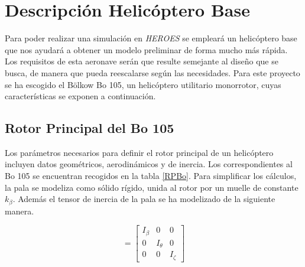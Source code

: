 \section{Descripción Helicóptero Base}

Para poder realizar una simulación en \emph{HEROES} se empleará un helicóptero base que nos ayudará a obtener un modelo preliminar de forma mucho más rápida. Los requisitos de esta aeronave serán que resulte semejante al diseño que se busca, de manera que pueda reescalarse según las necesidades. Para este proyecto se ha escogido el Bölkow Bo 105, un helicóptero utilitario monorrotor, cuyas características se exponen a continuación.

\subsection{Rotor Principal del Bo 105}

Los parámetros necesarios para definir el rotor principal de un helicóptero incluyen datos geométricos, aerodinámicos y de inercia. Los correspondientes al Bo 105 se encuentran recogidos en la tabla \ref{RPBo}.
Para simplificar los cálculos, la pala se modeliza como sólido rígido, unida al rotor por un muelle de constante $k_\beta$.
Además el tensor de inercia de la pala se ha modelizado de la siguiente manera.

\begin{equation}
[I_B]=\left[	
\begin{array}{ccc}
I_\beta & 0 & 0\\
0 & I_\theta & 0\\
0 & 0 & I_\zeta
\end{array}
\right]
\end{equation}

